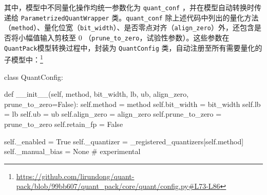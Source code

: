 \documentclass[
  fontset = source,
]{shtthesis}
\providecommand{\QP}{\texttt{QuantPack}}
\begin{document}
其中，模型中不同量化操作均统一参数化为 \verb|quant_conf| ，并在模型自动转换时传递给 \verb|ParametrizedQuantWrapper| 类。\verb|quant_conf| 除上述代码中列出的量化方法（\verb|method|）、量化位宽（\verb|bit_width|）、是否零点对齐（\verb|align_zero|）外，还包含是否将小幅值输入剪枝至 0 （\verb|prune_to_zero|，试验性参数）。这些参数在 \QP 模型转换过程中，封装为 \verb|QuantConfig| 类，自动注册至所有需要量化的子模型中：\footnote{\url{https://github.com/lirundong/quant-pack/blob/99bb607/quant_pack/core/quant/config.py\#L73-L86}}
\begin{python}
class QuantConfig:

    def __init__(self, method, bit_width, lb, ub, align_zero, prune_to_zero=False):
        self.method = method
        self.bit_width = bit_width
        self.lb = lb
        self.ub = ub
        self.align_zero = align_zero
        self.prune_to_zero = prune_to_zero
        self.retain_fp = False

        self._enabled = True
        self._quantizer = _registered_quantizers[self.method]
        self._manual_bias = None  # experimental
\end{python}
\end{document}
